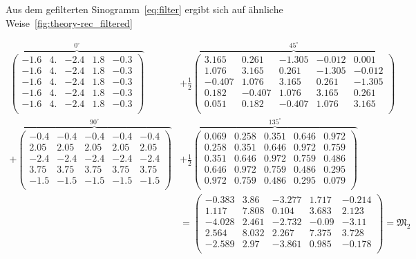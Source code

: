 \documentclass[slug=PET, room=Andreas-Schubert-Bau\,\ 424A, supervisor=Carsten\ Bittrich, coursedate=10.\ 01.\ 2020]{../../Lab_Report_LaTeX/lab_report}
\begin{document}
Aus dem gefilterten Sinogramm~\eqref{eq:filter} ergibt sich auf
\"ahnliche Weise~\ref{fig:theory-rec_filtered}

{\footnotesize
\setlength{\arraycolsep}{2.5pt}

\begin{align}
  \label{eq:simplerepr}
  \overbrace{\begin{pmatrix}
      -1.6 & 4. & -2.4 & 1.8 & -0.3\\
      -1.6 & 4. & -2.4 & 1.8 & -0.3\\
      -1.6 & 4. & -2.4 & 1.8 & -0.3\\
      -1.6 & 4. & -2.4 & 1.8 & -0.3\\
      -1.6 & 4. & -2.4 & 1.8 & -0.3\\
    \end{pmatrix}}^{0^\circ} & + \frac{1}{2}\overbrace{\begin{pmatrix}
      3.165 & 0.261 & -1.305 & -0.012 & 0.001\\
      1.076 & 3.165 & 0.261 & -1.305 & -0.012\\
      -0.407 & 1.076 & 3.165 & 0.261 & -1.305\\
      0.182 & -0.407 & 1.076 & 3.165 & 0.261\\
      0.051 & 0.182 & -0.407 & 1.076 & 3.165\\
    \end{pmatrix}}^{45^\circ} \nonumber \\ +
  \overbrace{\begin{pmatrix}
      -0.4 & -0.4 & -0.4 & -0.4 & -0.4\\
      2.05 & 2.05 & 2.05 & 2.05 & 2.05\\
      -2.4 & -2.4 & -2.4 & -2.4 & -2.4\\
      3.75 & 3.75 & 3.75 & 3.75 & 3.75\\
      -1.5 & -1.5 & -1.5 & -1.5 & -1.5\\
    \end{pmatrix}}^{90^\circ} &+ \frac{1}{2}\overbrace{\begin{pmatrix}
      0.069 & 0.258 & 0.351 & 0.646 & 0.972\\
      0.258 & 0.351 & 0.646 & 0.972 & 0.759\\
      0.351 & 0.646 & 0.972 & 0.759 & 0.486\\
      0.646 & 0.972 & 0.759 & 0.486 & 0.295\\
      0.972 & 0.759 & 0.486 & 0.295 & 0.079\\
    \end{pmatrix}}^{135^\circ}\nonumber \\
           &= \begin{pmatrix}
             -0.383 & 3.86 & -3.277 & 1.717 & -0.214\\
             1.117 & 7.808 & 0.104 & 3.683 & 2.123\\
             -4.028 & 2.461 & -2.732 & -0.09 & -3.11\\
             2.564 & 8.032 & 2.267 & 7.375 & 3.728\\
             -2.589 & 2.97 & -3.861 & 0.985 & -0.178\\
           \end{pmatrix} = \mathfrak{M}_2
\end{align}
}
\end{document}
